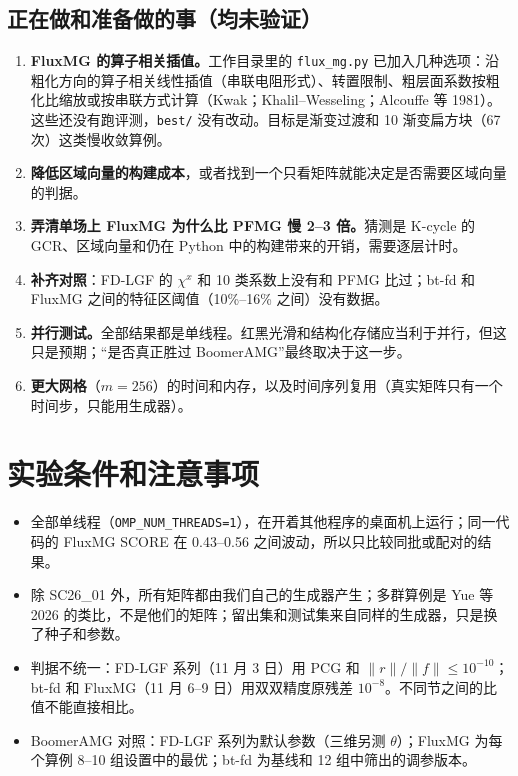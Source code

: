 \documentclass[11pt,a4paper]{ctexart}
\begin{document}
\subsection{正在做和准备做的事（均未验证）}
\begin{enumerate}
\item \textbf{FluxMG 的算子相关插值。}工作目录里的 \texttt{flux\_mg.py} 已加入几种选项：沿粗化方向的算子相关线性插值（串联电阻形式）、转置限制、粗层面系数按粗化比缩放或按串联方式计算（Kwak；Khalil--Wesseling；Alcouffe 等 1981）。这些还没有跑评测，\texttt{best/} 没有改动。目标是渐变过渡和 10 渐变扁方块（67 次）这类慢收敛算例。
\item \textbf{降低区域向量的构建成本}，或者找到一个只看矩阵就能决定是否需要区域向量的判据。
\item \textbf{弄清单场上 FluxMG 为什么比 PFMG 慢 2--3 倍。}猜测是 K-cycle 的 GCR、区域向量和仍在 Python 中的构建带来的开销，需要逐层计时。
\item \textbf{补齐对照}：FD-LGF 的 $\chi^x$ 和 10 类系数上没有和 PFMG 比过；bt-fd 和 FluxMG 之间的特征区阈值（10\%--16\% 之间）没有数据。
\item \textbf{并行测试。}全部结果都是单线程。红黑光滑和结构化存储应当利于并行，但这只是预期；“是否真正胜过 BoomerAMG”最终取决于这一步。
\item \textbf{更大网格}（$m=256$）的时间和内存，以及时间序列复用（真实矩阵只有一个时间步，只能用生成器）。
\end{enumerate}

\section{实验条件和注意事项}
\begin{itemize}
\item 全部单线程（\texttt{OMP\_NUM\_THREADS=1}），在开着其他程序的桌面机上运行；同一代码的 FluxMG SCORE 在 0.43--0.56 之间波动，所以只比较同批或配对的结果。
\item 除 SC26\_01 外，所有矩阵都由我们自己的生成器产生；多群算例是 Yue 等 2026 的类比，不是他们的矩阵；留出集和测试集来自同样的生成器，只是换了种子和参数。
\item 判据不统一：FD-LGF 系列（11 月 3 日）用 PCG 和 $\|r\|/\|f\|\le10^{-10}$；bt-fd 和 FluxMG（11 月 6--9 日）用双双精度原残差 $10^{-8}$。不同节之间的比值不能直接相比。
\item BoomerAMG 对照：FD-LGF 系列为默认参数（三维另测 $\theta$）；FluxMG 为每个算例 8--10 组设置中的最优；bt-fd 为基线和 12 组中筛出的调参版本。
\end{itemize}
\end{document}
